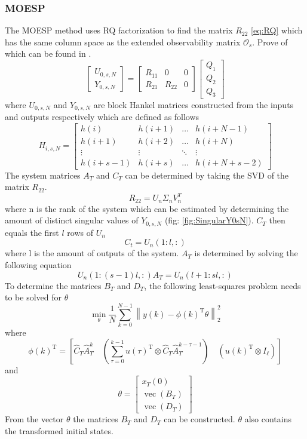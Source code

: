 \subsubsection{MOESP}
The MOESP method uses RQ factorization to find the matrix $R_{22}$ \ref{eq:RQ} which has the same column space as the extended observability matrix $\mathcal{O}_s$. Prove of which can be found in \cite[p.~304--305]{FilteringIdentification}.
\begin{equation}
    \left[\begin{array}{c}
        U_{0, s, N} \\
        Y_{0, s, N}
    \end{array}\right]=\left[\begin{array}{ccc}
        R_{11} & 0 & 0 \\
        R_{21} & R_{22} & 0
    \end{array}\right]\left[\begin{array}{c}
        Q_{1} \\
        Q_{2} \\
        Q_{3}
    \end{array}\right]
    \label{eq:RQ}
\end{equation}
where $U_{0,s,N}$ and $Y_{0,s,N}$ are block Hankel matrices constructed from the inputs and outputs respectively which are defined as follows
$$
H_{i, s, N}=\left[\begin{array}{cccc}
h(i) & h(i+1) & \dots & h(i+N-1) \\
h(i+1) & h(i+2) & \dots & h(i+N) \\
\vdots & \vdots & \ddots & \vdots \\
h(i+s-1) & h(i+s) & \dots & h(i+N+s-2)
\end{array}\right]
$$
The system matrices $A_T$ and $C_T$ can be determined by taking the SVD of the matrix $R_{22}$.
$$
R_{22} = U_n\Sigma_nV_n^T
$$
where n is the rank of the system which can be estimated by determining the amount of distinct singular values of $Y_{0,s,N}$ (fig: \ref{fig:SingularY0sN}). 
$C_T$ then equals the first $l$ rows of $U_n$
$$
C_t = U_n(1:l,:)
$$ 
where l is the amount of outputs of the system.
$A_T$ is determined by solving the following equation
$$
U_n(1:(s-1)l,:)A_T = U_n(l+1:sl,:)
$$
To determine the matrices $B_T$ and $D_T$, the following least-squares problem needs to be solved for $\theta$
$$
    \min _{\theta} \frac{1}{N} \sum_{k=0}^{N-1}\left\|y(k)-\phi(k)^{\mathrm{T}} \theta\right\|_{2}^{2}
$$
where
$$
    \phi(k)^{\mathrm{T}}=\left[\widehat{C}_{T} \widehat{A}_{T}^{k} \quad\left(\sum_{\tau=0}^{k-1} u(\tau)^{\mathrm{T}} \otimes \widehat{C}_{T} \widehat{A}_{T}^{k-\tau-1}\right) \quad\left(u(k)^{\mathrm{T}} \otimes I_{\ell}\right)\right]
$$
and
$$
    \theta=\left[\begin{array}{c}
    x_{T}(0) \\
    \operatorname{vec}\left(B_{T}\right) \\
    \operatorname{vec}\left(D_{T}\right)
    \end{array}\right]
$$
From the vector $\theta$ the matrices $B_T$ and $D_T$ can be constructed. $\theta$ also contains the transformed initial states.


